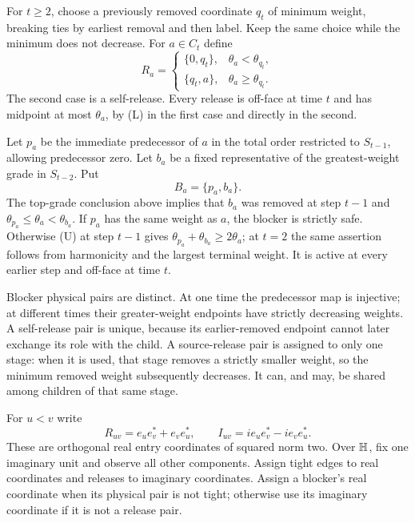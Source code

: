 For $t\ge2$, choose a previously removed coordinate $q_t$ of minimum weight, breaking ties by earliest removal and then label. Keep the same choice while the minimum does not decrease. For $a\in C_t$ define
\begin{equation}\label{eq:selfrelease}
 R_a=\begin{cases}
 \{0,q_t\},&\theta_a<\theta_{q_t},\\
 \{q_t,a\},&\theta_a\ge\theta_{q_t}.
 \end{cases}
\end{equation}
The second case is a self-release. Every release is off-face at time $t$ and has midpoint at most $\theta_a$, by (L) in the first case and directly in the second.

Let $p_a$ be the immediate predecessor of $a$ in the total order restricted to $S_{t-1}$, allowing predecessor zero. Let $b_a$ be a fixed representative of the greatest-weight grade in $S_{t-2}$. Put
\begin{equation}\label{eq:fineblocker}
 B_a=\{p_a,b_a\}.
\end{equation}
The top-grade conclusion above implies that $b_a$ was removed at step $t-1$ and $\theta_{p_a}\le\theta_a<\theta_{b_a}$. If $p_a$ has the same weight as $a$, the blocker is strictly safe. Otherwise (U) at step $t-1$ gives $\theta_{p_a}+\theta_{b_a}\ge2\theta_a$; at $t=2$ the same assertion follows from harmonicity and the largest terminal weight. It is active at every earlier step and off-face at time $t$.

Blocker physical pairs are distinct. At one time the predecessor map is injective; at different times their greater-weight endpoints have strictly decreasing weights. A self-release pair is unique, because its earlier-removed endpoint cannot later exchange its role with the child. A source-release pair is assigned to only one stage: when it is used, that stage removes a strictly smaller weight, so the minimum removed weight subsequently decreases. It can, and may, be shared among children of that same stage.

For $u<v$ write
\[
 R_{uv}=e_ue_v^*+e_ve_u^*,\qquad
 I_{uv}=i e_ue_v^*-i e_ve_u^*.
\]
These are orthogonal real entry coordinates of squared norm two. Over $\mathbb H$, fix one imaginary unit and observe all other components. Assign tight edges to real coordinates and releases to imaginary coordinates. Assign a blocker's real coordinate when its physical pair is not tight; otherwise use its imaginary coordinate if it is not a release pair.

